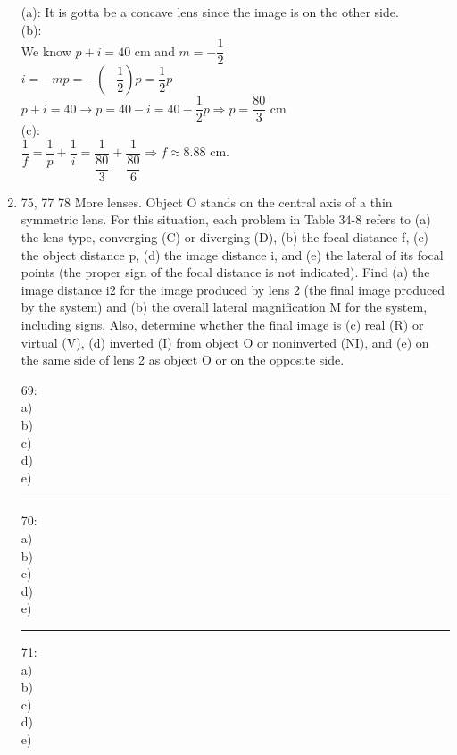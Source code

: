 \documentclass[fleqn]{article}
\begin{document}
\begin{enumerate}
    \textcolor{hwColor}{
      (a): It is gotta be a concave lens since the image is on the other side. \\
      (b): \\
      We know $p+i=40$ cm and $m=-\dfrac{1}{2}$ \\
      $i=-mp=-(-\dfrac{1}{2})p=\dfrac{1}{2}p$ \\
      $p+i=40 \rightarrow p=40-i=40-\dfrac{1}{2}p \Longrightarrow p=\dfrac{80}{3}$ cm \\
      (c): \\
      $\dfrac{1}{f}=\dfrac{1}{p}+\dfrac{1}{i}=\dfrac{1}{\dfrac{80}{3}}+\dfrac{1}{\dfrac{80}{6}} \Longrightarrow f\approx 8.88$ cm.
    }
    
    \item 75, 77 78 More lenses. Object O stands on the central axis of a thin symmetric lens. For this situation, each problem in Table 34-8 refers to (a) the lens type, converging (C) or diverging (D), (b) the focal distance f, (c) the object distance p, (d) the image distance i, and (e) the lateral of its focal points (the proper sign of the focal distance is not indicated). Find (a) the image distance i2 for the image produced by lens 2 (the final image produced by the system) and (b) the overall lateral magnification M for the system, including signs. Also, determine whether the final image is (c) real (R) or virtual (V), (d) inverted (I) from object O or noninverted (NI), and (e) on the same side of lens 2 as object O or on the opposite side.

    \textcolor{hwColor}{
      69: \\
      a)  \\
      b)  \\
      c)  \\
      d)  \\
      e)  \\
    }

    \textcolor{hwColor}{
      \rule{15cm}{0.4pt}
    }

    \textcolor{hwColor}{
      70: \\
      a)  \\
      b)  \\
      c)  \\
      d)  \\
      e)  \\
    }

    \textcolor{hwColor}{
      \rule{15cm}{0.4pt}
    }

    \textcolor{hwColor}{
      71: \\
      a)  \\
      b)  \\
      c)  \\
      d)  \\
      e)  \\
    }


\end{enumerate}
\end{document}
